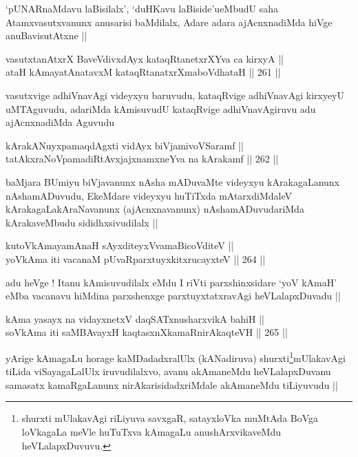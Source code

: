 \begin{artha}
`pUNARnaMdavu laBisilalx', `duHKavu laBiside'ueMbudU saha
  Atamxvasutxvanunx anusarisi baMdilalx, Adare adara ajAcnxnadiMda
  hiVge anuBavisutAtxne ||
\end{artha}

\begin{shl}
vasutxtanAtxrX BaveVdivxdAyx kataqRtanetxrXYva ca kirxyA ||  \\
ataH kAmayatAnatavxM kataqRtanatxrXmaboVdhataH ||  261 ||  
\end{shl}

\begin{artha}
vasutxvige adhiVnavAgi videyxyu baruvudu, kataqRvige adhiVnavAgi
kirxyeyU uMTAguvudu, adariMda kAmisuvudU kataqRvige adhiVnavAgiruvu
adu ajAcnxnadiMda Aguvudu 
\end{artha}

\begin{shl}
kArakANuyxpamaqdAgxti vidAyx biVjamivoVSaramf || \\
tatAkxraNoVpamadiRtAvxjajxnamxneYva na kArakamf ||  262 ||  
\end{shl}

\begin{artha}
baMjara BUmiyu biVjavanunx nAsha mADuvaMte videyxyu kArakagaLanunx
nAshamADuvudu, EkeMdare videyxyu huTiTxda mAtarxdiMdaleV
kArakagaLakAraNavanunx (ajAcnxnavanunx) nAshamADuvudariMda
kArakaveMbudu sididhxsivudilalx ||
\end{artha}

\begin{shl}
kutoV\s kAmayamAnaH sAyxditeyxVvamaBicoVditeV || \\
yoV\s kAma iti vacanaM pUvaRparxtuyxkitxrucayxteV ||  264 ||  
\end{shl}

\begin{artha}
adu heVge ! Itanu kAmisuvudilalx eMdu I riVti parxshinxsidare `yoV\s
kAmaH' eMba vacanavu hiMdina parxshenxge parxtuyxtatxravAgi
heVLalapxDuvadu || 
\end{artha}


\begin{shl}
kAma yasayx na vidayxnetxV daqSATxnusharxvikA bahiH || \\
soV\s kAma iti saMBAvayxH kaqtasxnXkamaRnirAkaqteVH ||  265 ||   
\end{shl}

\begin{artha}
yArige kAmagaLu horage kaMDadadxralUlx (kANadiruva) shurxti\footnote{shurxti mUlakavAgi riLiyuva savxgaR, satayxloVka muMtAda
  BoVga loVkagaLa meVle huTuTxva kAmagaLu anushArxvikaveMdu
  heVLalapxDuvuvu.}mUlakavAgi tiLida viSayagaLalUlx iruvudilalxvo, avanu akAmaneMdu
heVLalapxDuvanu samasatx kamaRgaLanunx nirAkarisidadxriMdale
akAmaneMdu tiLiyuvudu ||
\end{artha}

